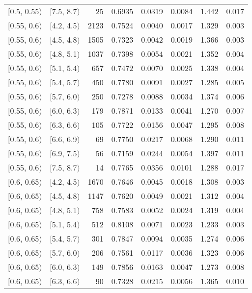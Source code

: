 \begin{longtable}{| l | l | r | r | r | r | r | r |}
        $[$0.5, 0.55$)$ & $[$7.5, 8.7$)$ & 25 & 0.6935 & 0.0319 & 0.0084 & 1.442 & 0.017 \\
        $[$0.55, 0.6$)$ & $[$4.2, 4.5$)$ & 2123 & 0.7524 & 0.0040 & 0.0017 & 1.329 & 0.003 \\
        $[$0.55, 0.6$)$ & $[$4.5, 4.8$)$ & 1505 & 0.7323 & 0.0042 & 0.0019 & 1.366 & 0.003 \\
        $[$0.55, 0.6$)$ & $[$4.8, 5.1$)$ & 1037 & 0.7398 & 0.0054 & 0.0021 & 1.352 & 0.004 \\
        $[$0.55, 0.6$)$ & $[$5.1, 5.4$)$ & 657 & 0.7472 & 0.0070 & 0.0025 & 1.338 & 0.004 \\
        $[$0.55, 0.6$)$ & $[$5.4, 5.7$)$ & 450 & 0.7780 & 0.0091 & 0.0027 & 1.285 & 0.005 \\
        $[$0.55, 0.6$)$ & $[$5.7, 6.0$)$ & 250 & 0.7278 & 0.0088 & 0.0034 & 1.374 & 0.006 \\
        $[$0.55, 0.6$)$ & $[$6.0, 6.3$)$ & 179 & 0.7871 & 0.0133 & 0.0041 & 1.270 & 0.007 \\
        $[$0.55, 0.6$)$ & $[$6.3, 6.6$)$ & 105 & 0.7722 & 0.0156 & 0.0047 & 1.295 & 0.008 \\
        $[$0.55, 0.6$)$ & $[$6.6, 6.9$)$ & 69 & 0.7750 & 0.0217 & 0.0068 & 1.290 & 0.011 \\
        $[$0.55, 0.6$)$ & $[$6.9, 7.5$)$ & 56 & 0.7159 & 0.0244 & 0.0054 & 1.397 & 0.011 \\
        $[$0.55, 0.6$)$ & $[$7.5, 8.7$)$ & 14 & 0.7765 & 0.0356 & 0.0101 & 1.288 & 0.017 \\
        $[$0.6, 0.65$)$ & $[$4.2, 4.5$)$ & 1670 & 0.7646 & 0.0045 & 0.0018 & 1.308 & 0.003 \\
        $[$0.6, 0.65$)$ & $[$4.5, 4.8$)$ & 1147 & 0.7620 & 0.0049 & 0.0021 & 1.312 & 0.004 \\
        $[$0.6, 0.65$)$ & $[$4.8, 5.1$)$ & 758 & 0.7583 & 0.0052 & 0.0024 & 1.319 & 0.004 \\
        $[$0.6, 0.65$)$ & $[$5.1, 5.4$)$ & 512 & 0.8108 & 0.0071 & 0.0023 & 1.233 & 0.003 \\
        $[$0.6, 0.65$)$ & $[$5.4, 5.7$)$ & 301 & 0.7847 & 0.0094 & 0.0035 & 1.274 & 0.006 \\
        $[$0.6, 0.65$)$ & $[$5.7, 6.0$)$ & 206 & 0.7561 & 0.0117 & 0.0036 & 1.323 & 0.006 \\
        $[$0.6, 0.65$)$ & $[$6.0, 6.3$)$ & 149 & 0.7856 & 0.0163 & 0.0047 & 1.273 & 0.008 \\
        $[$0.6, 0.65$)$ & $[$6.3, 6.6$)$ & 90 & 0.7328 & 0.0215 & 0.0056 & 1.365 & 0.010 \\

\end{longtable}
